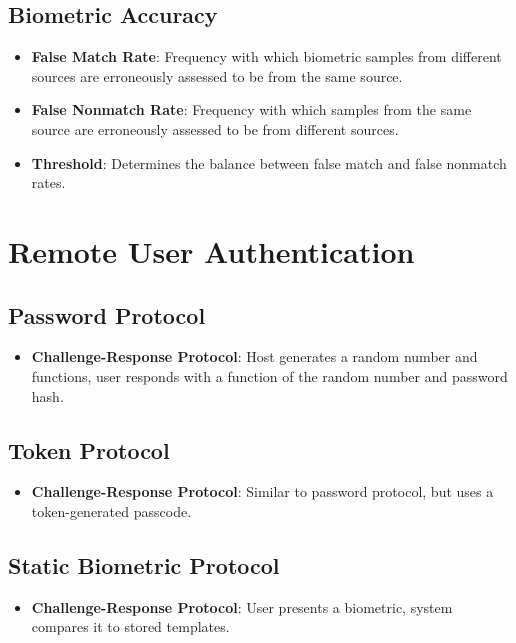\documentclass{article}
\begin{document}
\subsection{Biometric Accuracy}
\begin{itemize}
    \item \textbf{False Match Rate}: Frequency with which biometric samples from different sources are erroneously assessed to be from the same source.
    \item \textbf{False Nonmatch Rate}: Frequency with which samples from the same source are erroneously assessed to be from different sources.
    \item \textbf{Threshold}: Determines the balance between false match and false nonmatch rates.
\end{itemize}

\section{Remote User Authentication}
\subsection{Password Protocol}
\begin{itemize}
    \item \textbf{Challenge-Response Protocol}: Host generates a random number and functions, user responds with a function of the random number and password hash.
\end{itemize}

\subsection{Token Protocol}
\begin{itemize}
    \item \textbf{Challenge-Response Protocol}: Similar to password protocol, but uses a token-generated passcode.
\end{itemize}

\subsection{Static Biometric Protocol}
\begin{itemize}
    \item \textbf{Challenge-Response Protocol}: User presents a biometric, system compares it to stored templates.
\end{itemize}
\end{document}
